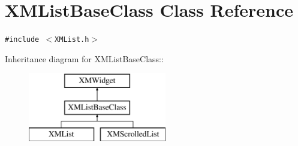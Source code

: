 \section{XMList\-Base\-Class  Class Reference}
\label{classXMListBaseClass}
{\tt \#include $<$XMList.h$>$}

Inheritance diagram for XMList\-Base\-Class::\begin{figure}[H]
\begin{center}
\leavevmode
\includegraphics[height=3cm]{classXMListBaseClass}
\end{center}
\end{figure}
